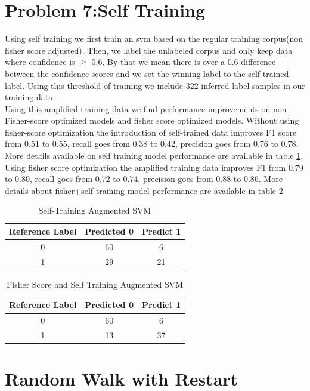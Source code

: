 \documentclass[11pt]{article}
\begin{document}
\section{Problem 7:Self Training}
Using self training we first train an svm based on the regular training corpus(non fisher score adjusted). Then, we label the unlabeled corpus and only keep data where confidence is $\ge$ 0.6. By that we mean there is over a 0.6 difference between the confidence scores and we set the winning label to the self-trained label. Using this threshold of training we include 322 inferred label samples in our training data. \\
Using this amplified training data we find performance improvements on non Fisher-score optimized models and fisher score optimized models. Without using fisher-score optimization the introduction of self-trained data improves F1 score from 0.51 to 0.55, recall goes from 0.38 to 0.42, precision goes from 0.76 to 0.78. More details available on self training model performance are available in table \ref{tab:Accuracy3}. Using fisher score optimization the amplified training data improves F1 from 0.79 to 0.80, recall goes from 0.72 to 0.74, precision goes from 0.88 to 0.86. More details about fisher+self training model performance are available in table \ref{tab:Accuracy4}
\begin{table}[]
    \centering
    \begin{tabular}{|c|c|c|} \hline
       Reference Label  & Predicted 0 & Predict 1   \\ \hline
       0 & 60 & 6 \\ \hline
       1 & 29 & 21 \\ \hline
    \end{tabular}
    \caption{Self-Training Augmented SVM}
    \label{tab:Accuracy3}
\end{table}
\begin{table}[]
    \centering
    \begin{tabular}{|c|c|c|} \hline
       Reference Label  & Predicted 0 & Predict 1   \\ \hline
       0 & 60 & 6 \\ \hline
       1 & 13 & 37 \\ \hline
    \end{tabular}
    \caption{Fisher Score and Self Training Augmented SVM}
    \label{tab:Accuracy4}
\end{table}
\section{Random Walk with Restart}
\end{document}

